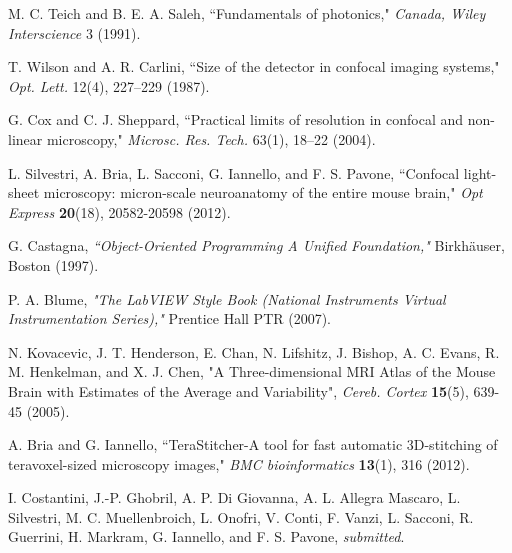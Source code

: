 \documentclass[12pt]{spieman}  %
\begin{document}
\begin{thebibliography}{0}
 M. C. Teich and B. E. A. Saleh, ``Fundamentals of photonics," \emph{Canada, Wiley Interscience} 3 (1991).

 T. Wilson and A. R. Carlini, ``Size of the detector in confocal imaging systems," \emph{Opt. Lett.} 12(4), 227–229 (1987).

 G. Cox and C. J. Sheppard, ``Practical limits of resolution in confocal and non-linear microscopy," \emph{Microsc. Res. Tech.} 63(1), 18–22 (2004).
 

 L. Silvestri, A. Bria, L. Sacconi, G. Iannello,  and F. S. Pavone,  ``Confocal light-sheet microscopy: micron-scale neuroanatomy of the entire mouse brain," \emph{Opt Express} \textbf{20}(18), 20582-20598 (2012).

 G. Castagna, \emph{``Object-Oriented Programming A Unified Foundation,"} Birkh{\"a}user, Boston (1997).

 P. A. Blume, \emph{"The LabVIEW Style Book (National Instruments Virtual Instrumentation Series),"} Prentice Hall PTR (2007).

 N. Kovacevic, J. T. Henderson, E. Chan, N. Lifshitz, J. Bishop, A. C. Evans, R. M. Henkelman, and X. J. Chen, "A Three-dimensional MRI Atlas of the Mouse Brain with Estimates of the Average and Variability", \emph{Cereb. Cortex} \textbf{15}(5), 639-45 (2005).



 A. Bria and G. Iannello,  ``TeraStitcher-A tool for fast automatic 3D-stitching of teravoxel-sized microscopy images,"  \emph{BMC bioinformatics} \textbf{13}(1), 316 (2012).

 I. Costantini, J.-P. Ghobril, A. P. Di Giovanna, A. L. Allegra Mascaro, L. Silvestri, M. C. Muellenbroich, L. Onofri, V. Conti, F. Vanzi, L. Sacconi, R. Guerrini, H. Markram, G. Iannello, and F. S. Pavone, \emph{submitted}.

\end{thebibliography}


\end{document}

